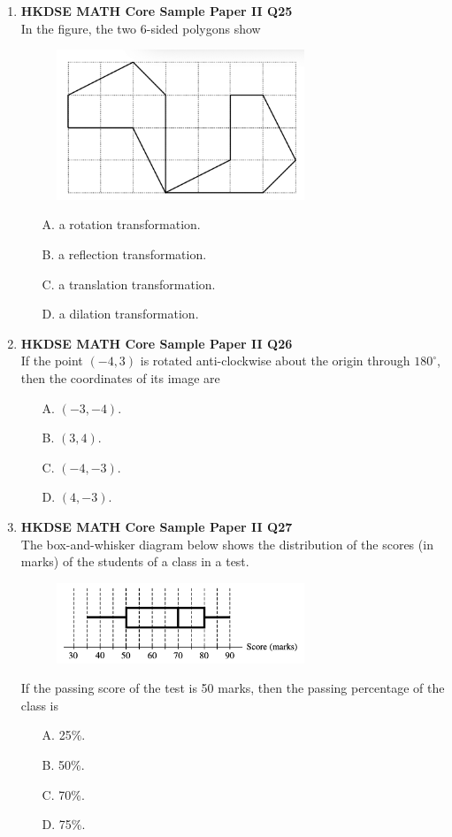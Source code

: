 \documentclass[12pt]{article}
\begin{document}
\begin{enumerate}
	\item \textbf{HKDSE MATH Core Sample Paper II Q25}\\
	In the figure, the two 6-sided polygons show
	\begin{figure}[H]
		\centering
		\includegraphics[width = 0.7\textwidth]{SPFigure2.25.png}	
	\end{figure}
	\begin{enumerate}
		\item[A.] a rotation transformation.
		\item[B.] a reflection transformation.
		\item[C.] a translation transformation.
		\item[D.] a dilation transformation.
	\end{enumerate}
	
	\item \textbf{HKDSE MATH Core Sample Paper II Q26}\\
	If the point $(-4, 3)$ is rotated anti-clockwise about the origin through $180^\circ$, then the coordinates of its image are
	\begin{enumerate}
		\item[A.] $(-3, -4)$.
		\item[B.] $(3, 4)$.
		\item[C.] $(-4, -3)$.
		\item[D.] $(4, -3)$.
	\end{enumerate}
	
	\item \textbf{HKDSE MATH Core Sample Paper II Q27}\\
	The box-and-whisker diagram below shows the distribution of the scores (in marks) of the students of a class in a test.
	\begin{figure}[H]
		\centering
		\includegraphics[width = 0.7\textwidth]{SPFigure2.27.png}	
	\end{figure}
	If the passing score of the test is 50 marks, then the passing percentage of the class is
	\begin{enumerate}
		\item[A.] 25\%.
		\item[B.] 50\%.
		\item[C.] 70\%.
		\item[D.] 75\%.
	\end{enumerate}
	

\end{enumerate}
\end{document}
